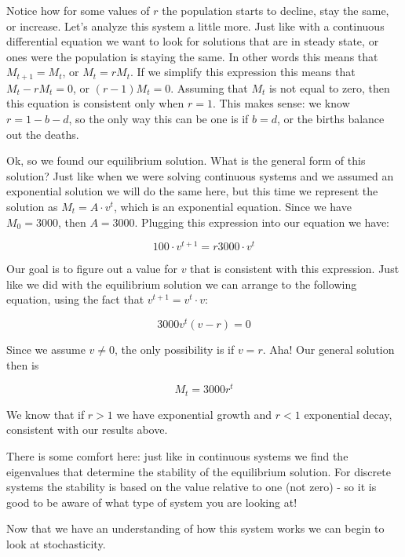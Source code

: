 \documentclass[
]{book}
\theoremstyle{definition}
\theoremstyle{definition}
\theoremstyle{definition}
\theoremstyle{remark}
\begin{document}
Notice how for some values of $r$ the population starts to decline, stay the same, or increase.  Let's analyze this system a little more.  Just like with a continuous differential equation we want to look for solutions that are in steady state, or ones were the population is staying the same.  In other words this means that $M_{t+1}=M_{t}$, or $M_{t}=rM_{t}$.  If we simplify this expression this means that $M_{t}-r M_{t}=0$, or $(r-1)M_{t}=0$.  Assuming that $M_{t}$ is not equal to zero, then this equation is consistent only when $r=1$.  This makes sense: we know $r=1-b-d$, so the only way this can be one is if $b=d$, or the births balance out the deaths.

Ok, so we found our equilibrium solution.  What is the general form of this solution? Just like when we were solving continuous systems and we assumed an exponential solution we will do the same here, but this time we represent the solution as $M_{t}=A\cdot v^{t}$, which is an exponential equation.  Since we have $M_{0}=3000$, then $A=3000$.  Plugging this expression into our equation we have:

\begin{equation}
100 \cdot v^{t+1} = r 3000 \cdot v^{t}
\end{equation}

Our goal is to figure out a value for $v$ that is consistent with this expression.  Just like we did with the equilibrium solution we can arrange to the following equation, using the fact that $v^{t+1}=v^{t}\cdot v$:

\begin{equation}
3000 v^{t} (v-r) = 0
\end{equation}

Since we assume $v\neq 0$, the only possibility is if $v=r$.  Aha!  Our general solution then is

\begin{equation}
M_{t}=3000 r^{t}
\end{equation}

We know that if $r>1$ we have exponential growth and $r<1$ exponential decay, consistent with our results above.

There is some comfort here: just like in continuous systems we find the eigenvalues that determine the stability of the equilibrium solution.  For discrete systems the stability is based on the value relative to one (not zero) - so it is good to be aware of what type of system you are looking at!

Now that we have an understanding of how this system works we can begin to look at stochasticity.
\end{document}
